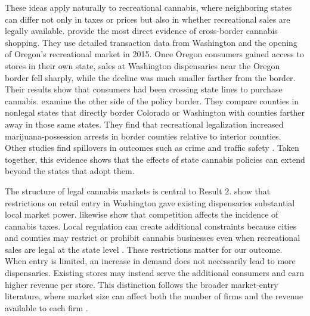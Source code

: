 \documentclass[12pt]{article}
\begin{document}
These ideas apply naturally to recreational cannabis, where neighboring states can differ not only in taxes
or prices but also in whether recreational sales are legally available. \citet{HansenMillerWeber2020} provide
the most direct evidence of cross-border cannabis shopping. They use detailed transaction data from
Washington and the opening of Oregon's recreational market in 2015. Once Oregon consumers gained access to
stores in their own state, sales at Washington dispensaries near the Oregon border fell sharply, while the
decline was much smaller farther from the border. Their results show that consumers had been crossing state
lines to purchase cannabis. \citet{HaoCowan2020} examine the other side of the policy border. They compare
counties in nonlegal states that directly border Colorado or Washington with counties farther away in those
same states. They find that recreational legalization increased marijuana-possession arrests in border
counties relative to interior counties. Other studies find spillovers in outcomes such as crime and traffic
safety \citep{WuBoatengLang2020,Moyer2026}. Taken together, this evidence shows that the effects of state
cannabis policies can extend beyond the states that adopt them.

The structure of legal cannabis markets is central to Result 2. \citet{HollenbeckUetake2021} show that
restrictions on retail entry in Washington gave existing dispensaries substantial local market power.
\citet{MacePatelSeegert2020} likewise show that competition affects the incidence of cannabis taxes. Local
regulation can create additional constraints because cities and counties may restrict or prohibit cannabis
businesses even when recreational sales are legal at the state level \citep{Yaskewich2022}. These
restrictions matter for our outcome. When entry is limited, an increase in demand does not necessarily lead
to more dispensaries. Existing stores may instead serve the additional consumers and earn higher revenue per
store. This distinction follows the broader market-entry literature, where market size can affect both the
number of firms and the revenue available to each firm \citep{BresnahanReiss1991}.
\end{document}
